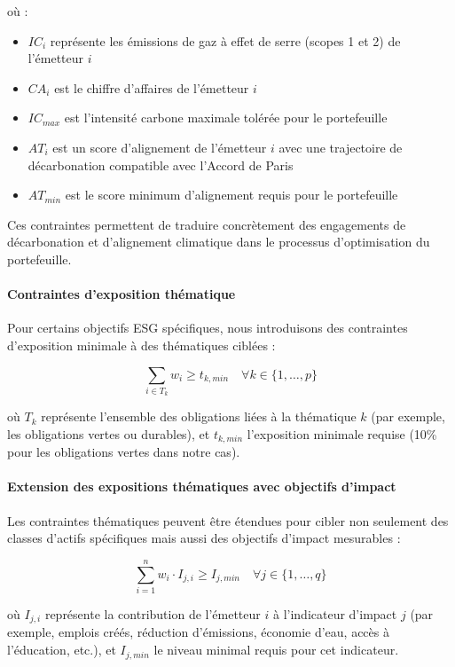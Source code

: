 où :
\begin{itemize}
    \item $IC_i$ représente les émissions de gaz à effet de serre (scopes 1 et 2) de l'émetteur $i$
    \item $CA_i$ est le chiffre d'affaires de l'émetteur $i$
    \item $IC_{max}$ est l'intensité carbone maximale tolérée pour le portefeuille
    \item $AT_i$ est un score d'alignement de l'émetteur $i$ avec une trajectoire de décarbonation compatible avec l'Accord de Paris
    \item $AT_{min}$ est le score minimum d'alignement requis pour le portefeuille
\end{itemize}

Ces contraintes permettent de traduire concrètement des engagements de décarbonation et d'alignement climatique dans le processus d'optimisation du portefeuille.

\paragraph{Contraintes d'exposition thématique} 
Pour certains objectifs ESG spécifiques, nous introduisons des contraintes d'exposition minimale à des thématiques ciblées :

\begin{equation}
\sum_{i \in T_k} w_i \geq t_{k,min} \quad \forall k \in \{1, \ldots, p\}
\end{equation}

où $T_k$ représente l'ensemble des obligations liées à la thématique $k$ (par exemple, les obligations vertes ou durables), et $t_{k,min}$ l'exposition minimale requise (10\% pour les obligations vertes dans notre cas).

\paragraph{Extension des expositions thématiques avec objectifs d'impact}
Les contraintes thématiques peuvent être étendues pour cibler non seulement des classes d'actifs spécifiques mais aussi des objectifs d'impact mesurables :

\begin{equation}
\sum_{i=1}^{n} w_i \cdot I_{j,i} \geq I_{j,min} \quad \forall j \in \{1, \ldots, q\}
\end{equation}

où $I_{j,i}$ représente la contribution de l'émetteur $i$ à l'indicateur d'impact $j$ (par exemple, emplois créés, réduction d'émissions, économie d'eau, accès à l'éducation, etc.), et $I_{j,min}$ le niveau minimal requis pour cet indicateur.

